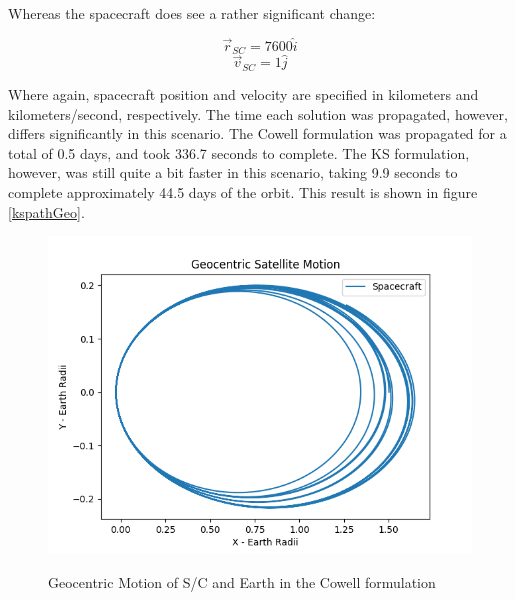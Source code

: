 \documentclass[11pt,twoside,letterpaper]{article}
\begin{document}
  Whereas the spacecraft does see a rather significant change:
  
  \begin{equation}
    \vec{r}_{SC} = 7600\hat{i}
  \end{equation}
  \begin{equation}
    \vec{v}_{SC} = 1\hat{j}
  \end{equation}

  Where again, spacecraft position and velocity are specified in
  kilometers and kilometers/second, respectively. The time each
  solution was propagated, however, differs significantly in this
  scenario. The Cowell formulation was propagated for a total of 0.5
  days, and took 336.7 seconds to complete. The KS formulation,
  however, was still quite a bit faster in this scenario, taking 9.9
  seconds to complete approximately 44.5 days of the orbit. This
  result is shown in figure \ref{kspathGeo}. 

  \begin{figure}
    \caption{Geocentric Motion of S/C and Earth in the Cowell formulation}
    \centering
    \includegraphics[scale=0.5]{GeoPlanarPath}
    \label{cowPathGeo}
  \end{figure}
\end{document}
